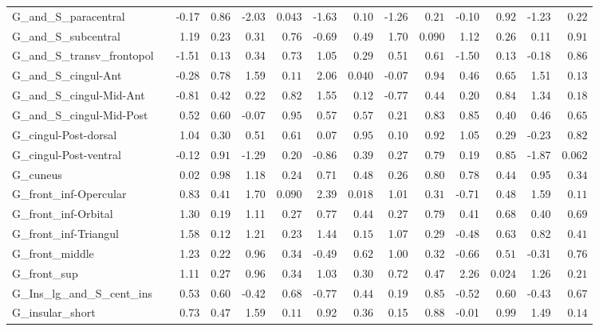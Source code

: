 {\begin{longtable}{llrrrrrrrrrrrr}
G\_and\_S\_paracentral &  & -0.17 & $0.86$ & -2.03 & $0.043$ & -1.63 & $0.10$ & -1.26 & $0.21$ & -0.10 & $0.92$ & -1.23 & $0.22$ \\
G\_and\_S\_subcentral &  & 1.19 & $0.23$ & 0.31 & $0.76$ & -0.69 & $0.49$ & 1.70 & $0.090$ & 1.12 & $0.26$ & 0.11 & $0.91$ \\
G\_and\_S\_transv\_frontopol &  & -1.51 & $0.13$ & 0.34 & $0.73$ & 1.05 & $0.29$ & 0.51 & $0.61$ & -1.50 & $0.13$ & -0.18 & $0.86$ \\
G\_and\_S\_cingul-Ant &  & -0.28 & $0.78$ & 1.59 & $0.11$ & 2.06 & $0.040$ & -0.07 & $0.94$ & 0.46 & $0.65$ & 1.51 & $0.13$ \\
G\_and\_S\_cingul-Mid-Ant &  & -0.81 & $0.42$ & 0.22 & $0.82$ & 1.55 & $0.12$ & -0.77 & $0.44$ & 0.20 & $0.84$ & 1.34 & $0.18$ \\
G\_and\_S\_cingul-Mid-Post &  & 0.52 & $0.60$ & -0.07 & $0.95$ & 0.57 & $0.57$ & 0.21 & $0.83$ & 0.85 & $0.40$ & 0.46 & $0.65$ \\
G\_cingul-Post-dorsal &  & 1.04 & $0.30$ & 0.51 & $0.61$ & 0.07 & $0.95$ & 0.10 & $0.92$ & 1.05 & $0.29$ & -0.23 & $0.82$ \\
G\_cingul-Post-ventral &  & -0.12 & $0.91$ & -1.29 & $0.20$ & -0.86 & $0.39$ & 0.27 & $0.79$ & 0.19 & $0.85$ & -1.87 & $0.062$ \\
G\_cuneus &  & 0.02 & $0.98$ & 1.18 & $0.24$ & 0.71 & $0.48$ & 0.26 & $0.80$ & 0.78 & $0.44$ & 0.95 & $0.34$ \\
G\_front\_inf-Opercular &  & 0.83 & $0.41$ & 1.70 & $0.090$ & 2.39 & $0.018$ & 1.01 & $0.31$ & -0.71 & $0.48$ & 1.59 & $0.11$ \\
G\_front\_inf-Orbital &  & 1.30 & $0.19$ & 1.11 & $0.27$ & 0.77 & $0.44$ & 0.27 & $0.79$ & 0.41 & $0.68$ & 0.40 & $0.69$ \\
G\_front\_inf-Triangul &  & 1.58 & $0.12$ & 1.21 & $0.23$ & 1.44 & $0.15$ & 1.07 & $0.29$ & -0.48 & $0.63$ & 0.82 & $0.41$ \\
G\_front\_middle &  & 1.23 & $0.22$ & 0.96 & $0.34$ & -0.49 & $0.62$ & 1.00 & $0.32$ & -0.66 & $0.51$ & -0.31 & $0.76$ \\
G\_front\_sup &  & 1.11 & $0.27$ & 0.96 & $0.34$ & 1.03 & $0.30$ & 0.72 & $0.47$ & 2.26 & $0.024$ & 1.26 & $0.21$ \\
G\_Ins\_lg\_and\_S\_cent\_ins &  & 0.53 & $0.60$ & -0.42 & $0.68$ & -0.77 & $0.44$ & 0.19 & $0.85$ & -0.52 & $0.60$ & -0.43 & $0.67$ \\
G\_insular\_short &  & 0.73 & $0.47$ & 1.59 & $0.11$ & 0.92 & $0.36$ & 0.15 & $0.88$ & -0.01 & $0.99$ & 1.49 & $0.14$ \\

\end{longtable}}
